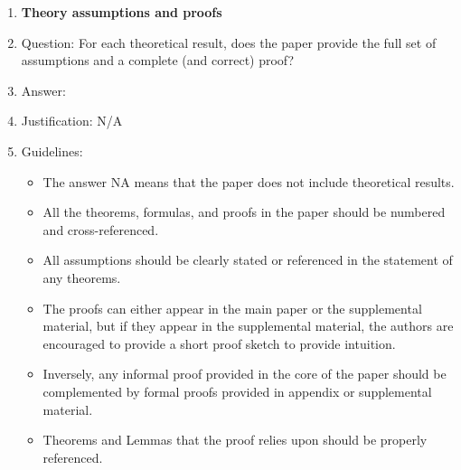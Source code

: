 \documentclass{article}
\begin{document}
\begin{enumerate}
\item {\bf Theory assumptions and proofs}
    \item[] Question: For each theoretical result, does the paper provide the full set of assumptions and a complete (and correct) proof?
    \item[] Answer: \answerNA{} %
    \item[] Justification: N/A
    \item[] Guidelines:
    \begin{itemize}
        \item The answer NA means that the paper does not include theoretical results. 
        \item All the theorems, formulas, and proofs in the paper should be numbered and cross-referenced.
        \item All assumptions should be clearly stated or referenced in the statement of any theorems.
        \item The proofs can either appear in the main paper or the supplemental material, but if they appear in the supplemental material, the authors are encouraged to provide a short proof sketch to provide intuition. 
        \item Inversely, any informal proof provided in the core of the paper should be complemented by formal proofs provided in appendix or supplemental material.
        \item Theorems and Lemmas that the proof relies upon should be properly referenced. 
    \end{itemize}


\end{enumerate}
\end{document}
